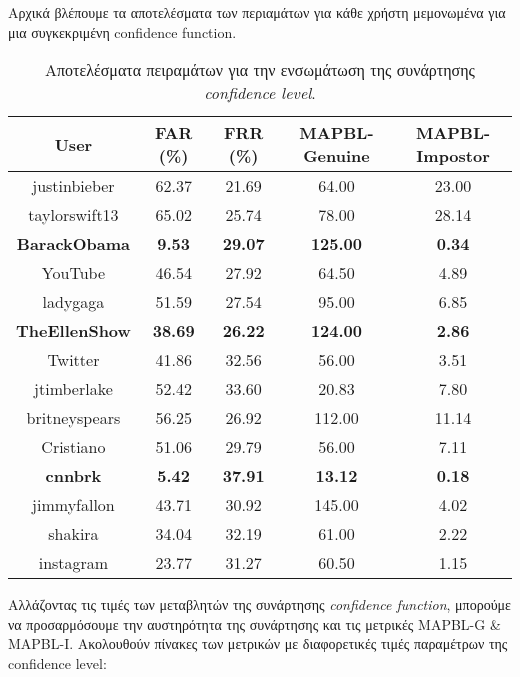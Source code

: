Αρχικά βλέπουμε τα αποτελέσματα των περιαμάτων για κάθε χρήστη μεμονωμένα για μια συγκεκριμένη confidence function.
\begin{table}[H]
\centering
\begin{tabular}{|c|c|c|c|c|}
\hline
\textbf{User} & \textbf{FAR (\%)} & \textbf{FRR (\%)} & \textbf{MAPBL-Genuine} & \textbf{MAPBL-Impostor} \\ \hline
justinbieber & 62.37 & 21.69 & 64.00 & 23.00 \\ \hline
taylorswift13 & 65.02 & 25.74 & 78.00 & 28.14 \\ \hline
\textbf{BarackObama} & \textbf{9.53} & \textbf{29.07} & \textbf{125.00} & \textbf{0.34} \\ \hline
YouTube & 46.54 & 27.92 & 64.50 & 4.89 \\ \hline
ladygaga & 51.59 & 27.54 & 95.00 & 6.85 \\ \hline
\textbf{TheEllenShow} & \textbf{38.69} & \textbf{26.22} & \textbf{124.00} & \textbf{2.86} \\ \hline
Twitter & 41.86 & 32.56 & 56.00 & 3.51 \\ \hline
jtimberlake & 52.42 & 33.60 & 20.83 & 7.80 \\ \hline
britneyspears & 56.25 & 26.92 & 112.00 & 11.14 \\ \hline
Cristiano & 51.06 & 29.79 & 56.00 & 7.11 \\ \hline
\textbf{cnnbrk} & \textbf{5.42} & \textbf{37.91} & \textbf{13.12} & \textbf{0.18} \\ \hline
jimmyfallon & 43.71 & 30.92 & 145.00 & 4.02 \\ \hline
shakira & 34.04 & 32.19 & 61.00 & 2.22 \\ \hline
instagram & 23.77 & 31.27 & 60.50 & 1.15 \\ \hline
\end{tabular}
\caption{Αποτελέσματα πειραμάτων για την ενσωμάτωση της συνάρτησης \textit{confidence level}.}
\label{tab:confidence_level_results}
\end{table}

Αλλάζοντας τις τιμές των μεταβλητών της συνάρτησης \textit{confidence function}, μπορούμε να προσαρμόσουμε την αυστηρότητα της συνάρτησης και τις μετρικές MAPBL-G \& MAPBL-I. Ακολουθούν πίνακες των μετρικών με διαφορετικές τιμές παραμέτρων της confidence level:

